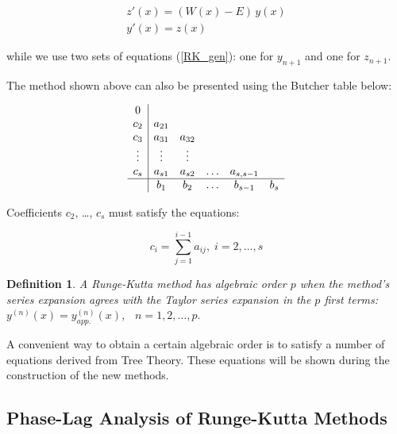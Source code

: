 \documentclass[numreferences]{kluwer}
\newtheorem{defn}{Definition}
\begin{document}
\begin{article}
\begin{equation}
\begin{array}{l}
\label{Schrodinger2}
   z'(x) = \left( W(x) - E \right) \, y(x)\\
   y'(x) = z(x)
\end{array}
\end{equation}

\noindent while we use two sets of equations (\ref{RK_gen}): one for $y_{n + 1}$ and one for $z_{n + 1}$.

\noindent The method shown above can also be presented using the Butcher table below:

\begin{equation}
\begin{array}{c|ccccc}
\label{table_RK}
0\\
c_{2} & a_{21}\\
c_{3} & a_{31} & a_{32}\\
\vdots& \vdots& \vdots\\
c_{s} & a_{s1}& a_{s2}& \ldots & a_{s,s-1}& \\
\hline
      & b_{1} & b_{2} & \ldots & b_{s-1}  & b_{s}\\
\end{array}
\end{equation}

\noindent Coefficients $c_{2}$, \ldots, $c_{s}$ must satisfy the equations:

\vspace{-10pt}
\begin{equation}
\label{eq_tree2}
    c_{i} = {\sum\limits_{j = 1}^{i-1} {a_{ij},\;i = 2,\ldots,s}}
\end{equation}

\begin{defn}
\label{defn_tree5} \emph{ \cite{butcher}
    A Runge-Kutta method has algebraic order $p$ when the method's series
    expansion agrees with the Taylor series expansion in the $p$ first terms:}
    $y^{( {n} )}( {x} ) = y_{app.}^{( {n} )} ( {x} )$, $\;\; n=1,2,\ldots,p.$
\end{defn}
\par

A convenient way to obtain a certain algebraic order is to satisfy a number of equations derived from Tree Theory.
These equations will be shown during the construction of the new methods.

\subsection{Phase-Lag Analysis of Runge-Kutta Methods}


\end{article}
\end{document}
